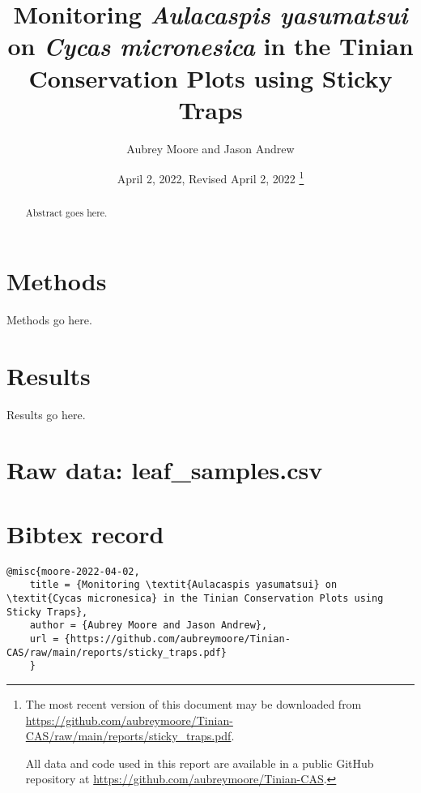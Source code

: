 \documentclass[12pt,letterpaper,english,bibliography=totocnumbered, abstract=on]{scrartcl}
\begin{document}
\titlehead{Technical Report}

\title{Monitoring \textit{Aulacaspis yasumatsui} on \textit{Cycas micronesica} in the Tinian Conservation Plots using Sticky Traps}

\author{Aubrey Moore and Jason Andrew}

\date{
	April 2, 2022, Revised April 2, 2022
	\footnote{
		The most recent version of this document may be downloaded from \url{https://github.com/aubreymoore/Tinian-CAS/raw/main/reports/sticky_traps.pdf}.
		
		All data and code used in this report are available in a public GitHub repository at
		\url{https://github.com/aubreymoore/Tinian-CAS}.
	}
}

\maketitle


\begin{abstract}
	Abstract goes here.
\end{abstract}



\clearpage
\tableofcontents

\clearpage
\section{Methods}

Methods go here.

\section{Results}

Results go here.

\clearpage
\begin{appendices}
	
	\section{Raw data: leaf\_samples.csv}
	\label{leaf_samples.csv}
	
		

	\section{Bibtex record}
	\begin{lstlisting}[basicstyle=\small\ttfamily, breaklines=true, columns=flexible]
	@misc{moore-2022-04-02,
	title = {Monitoring \textit{Aulacaspis yasumatsui} on \textit{Cycas micronesica} in the Tinian Conservation Plots using Sticky Traps},
	author = {Aubrey Moore and Jason Andrew},
	url = {https://github.com/aubreymoore/Tinian-CAS/raw/main/reports/sticky_traps.pdf} 	
	}
	\end{lstlisting}
		
\end{appendices}
\end{document}
